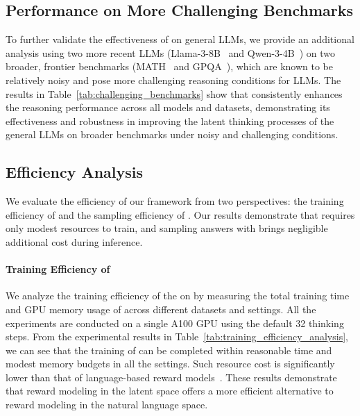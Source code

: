 \documentclass{article} %
\begin{document}
\subsection{Performance on More Challenging Benchmarks}

To further validate the effectiveness of \LTO on general LLMs, we provide an additional analysis using two more recent LLMs (Llama-3-8B~\citep{team2024llama} and Qwen-3-4B~\citep{yang2025qwen3}) on two broader, frontier benchmarks (MATH~\citep{hendrycks2021measuring} and GPQA~\citep{rein2024gpqa}), which are known to be relatively noisy and pose more challenging reasoning conditions for LLMs. The results in Table~\ref{tab:challenging_benchmarks} show that \LTO consistently enhances the reasoning performance across all models and datasets, demonstrating its effectiveness and robustness in improving the latent thinking processes of the general LLMs on broader benchmarks under noisy and challenging conditions.
\subsection{Efficiency Analysis}
\label{appendix:efficiency_analysis}
We evaluate the efficiency of our framework from two perspectives: the training efficiency of \LRM and the sampling efficiency of \LTO. Our results demonstrate that \LRM requires only modest resources to train, and sampling answers with \LTO brings negligible additional cost during inference.


\paragraph*{Training Efficiency of \LRM}
%
We analyze the training efficiency of the \LRM on \LRLM by measuring the total training time and GPU memory usage of \LRM across different datasets and settings. All the experiments are conducted on a single A100 GPU using the default 32 thinking steps. From the experimental results in Table~\ref{tab:training_efficiency_analysis}, we can see that the training of \LRM can be completed within reasonable time and modest memory budgets in all the settings. Such resource cost is significantly lower than that of language-based reward models~\citep{wang-etal-2024-math,lu2024autopsv}. These results demonstrate that reward modeling in the latent space offers a more efficient alternative to reward modeling in the natural language space.
%
\end{document}
